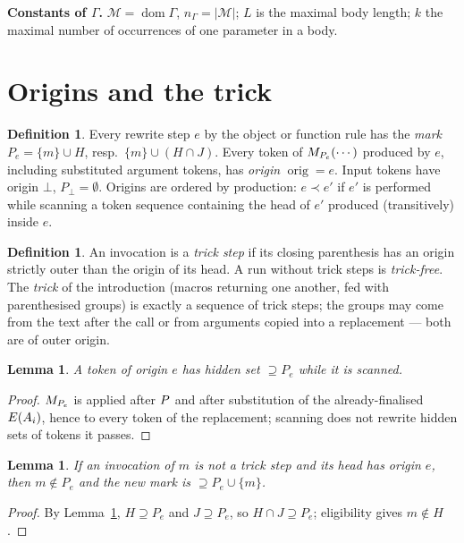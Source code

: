 \documentclass[10pt]{article}
\newtheorem{lemma}[theorem]{Lemma}
\theoremstyle{definition}
\newtheorem{definition}[theorem]{Definition}
\theoremstyle{remark}
\newcommand{\orig}{\operatorname{orig}}\newcommand{\lev}{\operatorname{lev}}
\begin{document}
\textbf{Constants of $\Gamma$.} $\mathcal M=\operatorname{dom}\Gamma$, $n_\Gamma=|\mathcal M|$; $L$ is the maximal body
length; $k$ the maximal number of occurrences of one parameter in a body.

\section{Origins and the trick}
\begin{definition}
Every rewrite step $e$ by the object or function rule has the \emph{mark} $P_e=\{m\}\cup H$, resp.\ $\{m\}\cup(H\cap J)$.
Every token of $M_{P_e}(\cdots)$ produced by $e$, including substituted argument tokens, has \emph{origin}
$\orig=e$. Input tokens have origin $\bot$, $P_\bot=\emptyset$. Origins are ordered by production: $e\prec e'$ if $e'$ is
performed while scanning a token sequence containing the head of $e'$ produced (transitively) inside $e$.
\end{definition}
\begin{definition}
An invocation is a \emph{trick step} if its closing parenthesis has an origin strictly outer than the origin of its head.
A run without trick steps is \emph{trick-free}. The \emph{trick} of the introduction (macros returning one another, fed
with parenthesised groups) is exactly a sequence of trick steps; the groups may come from the text after the call or from
arguments copied into a replacement --- both are of outer origin.
\end{definition}

\begin{lemma}\label{l:inv}
A token of origin $e$ has hidden set $\supseteq P_e$ while it is scanned.
\end{lemma}
\begin{proof}
$M_{P_e}$ is applied after $P$ and after substitution of the already-finalised $E(A_i)$, hence to every token of
the replacement; scanning does not rewrite hidden sets of tokens it passes.
\end{proof}

\begin{lemma}\label{l:grow}
If an invocation of $m$ is not a trick step and its head has origin $e$, then $m\notin P_e$ and the new mark is
$\supseteq P_e\cup\{m\}$.
\end{lemma}
\begin{proof}
By Lemma~\ref{l:inv}, $H\supseteq P_e$ and $J\supseteq P_e$, so $H\cap J\supseteq P_e$; eligibility gives $m\notin H$.
\end{proof}
\end{document}

